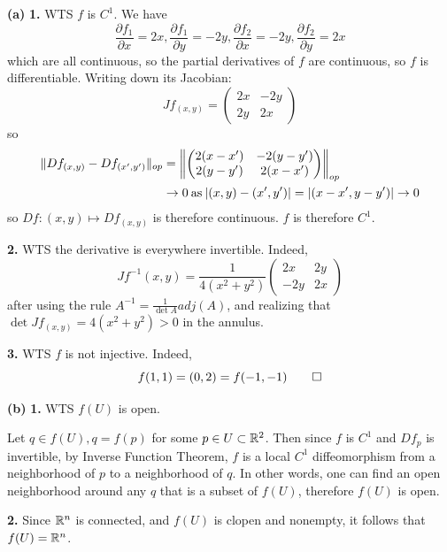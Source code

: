 \documentclass[a4paper, 12pt]{article}
\begin{document}
\begin{solution}
    \textbf{(a)} 
    \textbf{1.} WTS $f$ is $C^1$. 
    We have 
    \[
        \frac{\partial f_1}{\partial x} = 2x,
        \frac{\partial f_1}{\partial y} = -2y,
        \frac{\partial f_2}{\partial x} = -2y,
        \frac{\partial f_2}{\partial y} = 2x
    \]
    which are all continuous, so the partial derivatives of $f$ are continuous, so $f$ is differentiable. Writing down its Jacobian: \[
    Jf_{(x, y)} = \begin{pmatrix}
    2x & -2y \\
    2y & 2x
    \end{pmatrix}
    \]
    so \begin{align*}
        \norm{Df_{(x, y)} - Df_{(x', y')}}_{op}
        &= \norm*{\begin{pmatrix}
    2(x-x') & -2(y-y') \\
    2(y-y') & 2(x - x')
    \end{pmatrix}}_{op} \\
    & \to 0 \:\text{as}\: \abs{(x, y) - (x', y')} = \abs{(x - x', y - y')} \to 0
    \end{align*}
    so $Df: (x, y) \mapsto Df_{(x, y)}$ is therefore continuous. $f$ is therefore $C^1$.

    \textbf{2.} WTS the derivative is everywhere invertible. Indeed, \[
    Jf^{-1}(x, y) = \frac{1}{4(x^2 + y^2)} \begin{pmatrix}
    2x & 2y \\
    -2y & 2x
    \end{pmatrix}
    \]
    after using the rule $A^{-1} = \frac{1}{\det A} adj(A)$, and realizing that $\det Jf_{(x, y)} = 4(x^2 + y^2) > 0$ in the annulus.

    \textbf{3.} WTS $f$ is not injective. Indeed, \[
    f(1, 1) = (0, 2) = f(-1, -1) \qed
    \]
    
    \textbf{(b)} \textbf{1.} WTS $f(U)$ is open. 

    Let $q \in f(U), q = f(p) $ for some $p \in U \subset \bbr^2$. Then since $f$ is $C^1$ and $Df_p$ is invertible, by Inverse Function Theorem, $f$ is a local $C^1$ diffeomorphism from a neighborhood of $p$ to a neighborhood of $q$. In other words, one can find an open neighborhood around any $q$ that is a subset of $f(U)$, therefore $f(U)$ is open.

    \textbf{2.} Since $\bbr^n$ is connected, and $f(U)$ is clopen and nonempty, it follows that $f(U) = \Rn$.
\end{solution}
\end{document}
